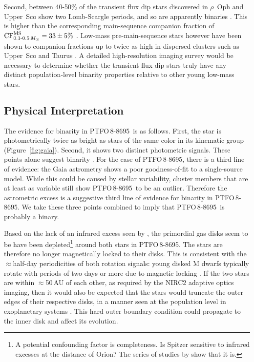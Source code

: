 \documentclass[12pt,twocolumn,tighten]{aastex62}
\newcommand{\ptfo}{PTFO$\,$8-8695}
\begin{document}
Second, between 40-50\% of the transient flux dip stars discovered in
$\rho$~Oph and Upper~Sco show two
Lomb-Scargle periods, and so are apparently binaries
\citep[][Table~1]{stauffer_orbiting_2017}.
This is higher than the corresponding main-sequence companion
fraction of ${\rm CF}_{0.1\text{-}0.5\,M_\odot}^{\rm MS} = 33 \pm 5\%$
\citep{henry_solar_2006,duchene_stellar_2013}.
Low-mass pre-main-sequence stars however have been shown to 
companion fractions up to twice as high in dispersed clusters such as
Upper~Sco and Taurus \citep{kraus_mapping_2008,kraus_mapping_2011}.
A detailed high-resolution imaging survey would be necessary to determine
whether the transient flux dip stars truly have any distinct
population-level binarity properties relative to other young low-mass
stars.


\subsection{Physical Interpretation}
\label{subsec:physical}

The evidence for binarity in \ptfo\ is as follows.  First, the star is
photometrically twice as bright as stars of the same color in its
kinematic group (Figure~\ref{fig:gaia}).  Second, it shows two distinct
photometric signals.  These points alone suggest binarity
\citep{stauffer_rotevol_2018}.  For the case of \ptfo, there is a
third line of evidence: the Gaia astrometry shows a poor
goodness-of-fit to a single-source model.  While this could be caused
by stellar variability, cluster members
that are at least as variable still show \ptfo\ to be an
outlier.  Therefore the astrometric excess is a suggestive third line
of evidence for binarity in \ptfo.  We take these three points
combined to imply that \ptfo\ is probably a binary.

Based on the lack of an infrared excess seen by \citet{yu_tests_2015},
the primordial gas disks seem to be have been depleted\footnote{A
potential confounding factor is completeness. Is Spitzer sensitive to
infrared excesses at the distance of Orion? The series of studies by
\cite{hernandez_spitzer_2006,hernandez_spitzer_ob1_2007,hernandez_spitzer_sig_2007,hernandez_spitzer_2009}
show that it is.} around both stars in \ptfo. The stars are therefore
no longer magnetically locked to their disks.  This is consistent with
the $\approx$half-day periodicities of both rotation signals: young
disked M dwarfs typically rotate with periods of two days or more due
to magnetic locking \citep[{\it e.g.},][]{rebull_rotation_2020}.  If
the two stars are within $\approx$50$\,$AU of each other, as required
by the NIRC2 adaptive optics imaging, then it would also be expected
that the stars would truncate the outer edges of their respective
disks, in a manner seen at the population level in exoplanetary
systems \citep{kraus_impact_2016,moe_impact_2019}.  This hard outer
boundary condition could propagate to the inner disk and affect its
evolution.
\end{document}
